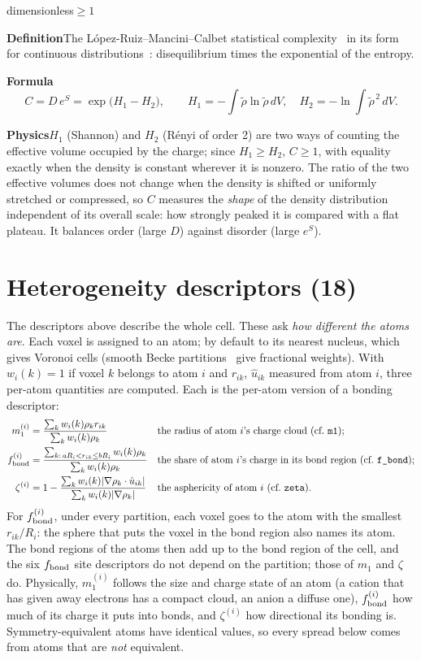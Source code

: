 \documentclass[11pt,a4paper]{article}
\newcommand{\dn}[1]{\texttt{\detokenize{#1}}}
\newcommand{\desc}[3]{\par\needspace{7\baselineskip}\vspace{1.3ex}%
  \phantomsection\label{d:#1}%
  \noindent\parbox[t]{0.68\linewidth}{\raggedright\color{MidnightBlue}\large\bfseries\dn{#2}}%
  \hfill\parbox[t]{0.30\linewidth}{\raggedleft\small\color{black!60}#3}\par
  \vspace{-0.5ex}{\color{MidnightBlue!35}\hrule height 0.5pt}\vspace{0.5ex}}
\newcommand{\lab}[1]{{\small\sffamily\bfseries\color{MidnightBlue}#1}\enspace}
\newcommand{\Def}{\par\lab{Definition}}
\newcommand{\Frm}{\par\lab{Formula}}
\newcommand{\Phy}{\par\lab{Physics}}
\newcommand{\rhot}{\tilde\rho}
\begin{document}
\desc{LMC_complexity}{LMC_complexity}{dimensionless\quad$\ge 1$}
\Def The L\'opez-Ruiz--Mancini--Calbet statistical complexity~\cite{lmc} in its form for
continuous distributions~\cite{catalan}: disequilibrium times the exponential of the entropy.
\Frm
\[
C = D\,e^{S}=\exp\!\big(H_1-H_2\big),\qquad H_1=-\!\int\rhot\ln\rhot\,dV,\quad H_2=-\ln\!\int\rhot^{\,2}\,dV .
\]
\Phy $H_1$ (Shannon) and $H_2$ (Rényi of order 2) are two ways of counting the effective volume
occupied by the charge; since $H_1\ge H_2$, $C\ge1$, with equality exactly when the density is
constant wherever it is nonzero. The ratio of the two effective volumes does not change when the
density is shifted or uniformly stretched or compressed, so $C$ measures the \emph{shape} of the
density distribution independent of its overall scale: how strongly peaked it is compared with a
flat plateau. It balances order (large $D$) against disorder (large $e^{S}$).

\section{Heterogeneity descriptors (18)}\label{sec:het}
The descriptors above describe the whole cell. These ask \emph{how different the atoms are}. Each
voxel is assigned to an atom; by default to its nearest nucleus, which gives Voronoi cells
(smooth Becke partitions~\cite{becke} give fractional weights). With $w_i(k)=1$ if voxel $k$
belongs to atom $i$ and $r_{ik}$, $\hat u_{ik}$ measured from atom $i$, three per-atom quantities are
computed. Each is the per-atom version of a bonding descriptor:
\begin{align*}
m_1^{(i)}&=\frac{\sum_k w_i(k)\rho_k r_{ik}}{\sum_k w_i(k)\rho_k}
&&\text{the radius of atom $i$'s charge cloud (cf.\ \dn{m1});}\\
f_{\rm bond}^{(i)}&=\frac{\sum_{k:\,aR_i<r_{ik}\le bR_i} w_i(k)\rho_k}{\sum_k w_i(k)\rho_k}
&&\text{the share of atom $i$'s charge in its bond region (cf.\ \dn{f_bond});}\\
\zeta^{(i)}&=1-\frac{\sum_k w_i(k)|\nabla\rho_k\cdot\hat u_{ik}|}{\sum_k w_i(k)|\nabla\rho_k|}
&&\text{the asphericity of atom $i$ (cf.\ \dn{zeta}).}
\end{align*}
For $f_{\rm bond}^{(i)}$, under every partition, each voxel goes to the atom with the smallest
$r_{ik}/R_i$: the sphere that puts the voxel in the bond region also names its atom. The bond
regions of the atoms then add up to the bond region of the cell, and the six $f_{\rm bond}$ site
descriptors do not depend on the partition; those of $m_1$ and $\zeta$ do.
Physically, $m_1^{(i)}$ follows the size and charge state of an atom (a cation that has given away
electrons has a compact cloud, an anion a diffuse one), $f_{\rm bond}^{(i)}$ how much of its charge
it puts into bonds, and $\zeta^{(i)}$ how directional its bonding is. Symmetry-equivalent atoms have
identical values, so every spread below comes from atoms that are \emph{not} equivalent.
\end{document}
